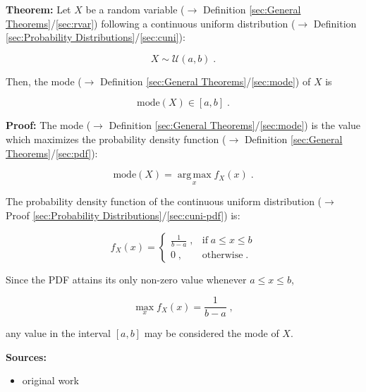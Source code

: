 \documentclass[a4paper,12pt,twoside]{book}
\begin{document}
\textbf{Theorem:} Let $X$ be a random variable ($\rightarrow$ Definition \ref{sec:General Theorems}/\ref{sec:rvar}) following a continuous uniform distribution ($\rightarrow$ Definition \ref{sec:Probability Distributions}/\ref{sec:cuni}):

\begin{equation} \label{eq:cuni-med-cuni}
X \sim \mathcal{U}(a, b) \; .
\end{equation}

Then, the mode ($\rightarrow$ Definition \ref{sec:General Theorems}/\ref{sec:mode}) of $X$ is

\begin{equation} \label{eq:cuni-med-cuni-mode}
\mathrm{mode}(X) \in [a,b] \; .
\end{equation}


\vspace{1em}
\textbf{Proof:}  The mode ($\rightarrow$ Definition \ref{sec:General Theorems}/\ref{sec:mode}) is the value which maximizes the probability density function ($\rightarrow$ Definition \ref{sec:General Theorems}/\ref{sec:pdf}):

\begin{equation} \label{eq:cuni-med-mode}
\mathrm{mode}(X) = \operatorname*{arg\,max}_x f_X(x) \; .
\end{equation}

The probability density function of the continuous uniform distribution ($\rightarrow$ Proof \ref{sec:Probability Distributions}/\ref{sec:cuni-pdf}) is:

\begin{equation} \label{eq:cuni-med-cuni-pdf}
f_X(x) = \left\{
\begin{array}{rl}
\frac{1}{b-a} \; , & \text{if} \; a \leq x \leq b \\
0 \; , & \text{otherwise} \; .
\end{array}
\right.
\end{equation}

Since the PDF attains its only non-zero value whenever $a \leq x \leq b$,

\begin{equation} \label{eq:cuni-med-cuni-pdf-max}
\operatorname*{max}_x f_X(x) = \frac{1}{b-a} \; ,
\end{equation}

any value in the interval $[a,b]$ may be considered the mode of $X$.


\vspace{1em}
\textbf{Sources:}
\begin{itemize}
\item original work\end{itemize}
\end{document}
